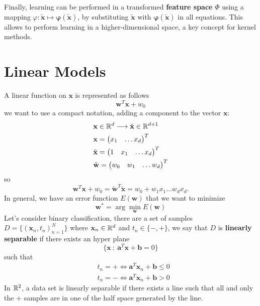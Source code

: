 \documentclass[10pt, letterpaper]{report}
\begin{document}
\bigskip
Finally, learning can be performed in a transformed \textbf{feature space} $\Phi$ using a mapping $\varphi:\tilde{\mathbf x}\mapsto\boldsymbol\varphi(\tilde{\mathbf x})$, by substituting $\tilde{\mathbf x}$ with $\boldsymbol\varphi(\tilde{\mathbf x})$ in all equations.
This allows to perform learning in a higher-dimensional space, a key concept for kernel methods.

\chapter{Linear Models}
A linear function on $\mathbf x$ is represented as follows\begin{equation}
	\mathbf w^T\mathbf x+w_0
\end{equation}
we want to use a compact notation, adding a component to the vector $\mathbf x$:\begin{align}
	 & \mathbf x \in {\mathbb R}^d\longrightarrow \tilde{\mathbf x}\in {\mathbb R}^{d+1} \\
	 & \mathbf x=\begin{pmatrix}
		             x_1 & \dots x_d
	             \end{pmatrix}^T                                       \\
	 & \tilde{\mathbf x}=\begin{pmatrix}
		                     1 & x_1 & \dots x_d
	                     \end{pmatrix}^T                           \\
	 & \tilde{\mathbf w}=\begin{pmatrix}
		                     w_0 & w_1 & \dots w_d
	                     \end{pmatrix}^T
\end{align}
so\begin{equation}
	\mathbf w^T\mathbf x +w_0=\tilde{\mathbf w}^T\tilde{\mathbf x}=w_0+w_1x_1\dots w_dx_d.
\end{equation}
In general, we have an error function $E(\mathbf w)$ that we want to minimize\begin{equation}
	\mathbf w^*=\arg\min_{\mathbf w}E(\mathbf w)
\end{equation}
Let's consider binary classification, there are a set of samples $D=\{(\mathbf x_n,t_n)_{n=1}^N\}$ where $\mathbf x_n\in {\mathbb R}^d$ and $t_n\in\{-,+\}$, we say that $D$ is \textbf{linearly separable} if there exists an hyper plane $$ \{\mathbf x \  : \ \mathbf a^T\mathbf x+\mathbf b= 0\}$$ such that
\begin{align}
	 & t_n=+\iff \mathbf a^T\mathbf x_n+\mathbf b\le 0 \\
	 & t_n=-\iff \mathbf a^T\mathbf x_n+\mathbf b> 0
\end{align}
In ${\mathbb R}^2$, a data set is linearly separable if there exists a line such that all and only the $+$ samples are in one of the half space generated by the line.\bigskip
\end{document}
